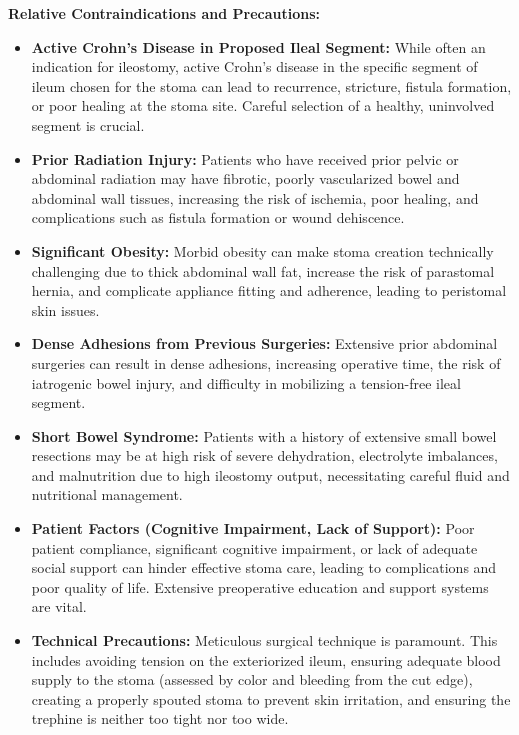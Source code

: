 \textbf{Relative Contraindications and Precautions:}
\begin{itemize}
  \item \textbf{Active Crohn's Disease in Proposed Ileal Segment:} While often an indication for ileostomy, active Crohn's disease in the specific segment of ileum chosen for the stoma can lead to recurrence, stricture, fistula formation, or poor healing at the stoma site. Careful selection of a healthy, uninvolved segment is crucial.
  
  \item \textbf{Prior Radiation Injury:} Patients who have received prior pelvic or abdominal radiation may have fibrotic, poorly vascularized bowel and abdominal wall tissues, increasing the risk of ischemia, poor healing, and complications such as fistula formation or wound dehiscence.
  
  \item \textbf{Significant Obesity:} Morbid obesity can make stoma creation technically challenging due to thick abdominal wall fat, increase the risk of parastomal hernia, and complicate appliance fitting and adherence, leading to peristomal skin issues.
  
  \item \textbf{Dense Adhesions from Previous Surgeries:} Extensive prior abdominal surgeries can result in dense adhesions, increasing operative time, the risk of iatrogenic bowel injury, and difficulty in mobilizing a tension-free ileal segment.
  
  \item \textbf{Short Bowel Syndrome:} Patients with a history of extensive small bowel resections may be at high risk of severe dehydration, electrolyte imbalances, and malnutrition due to high ileostomy output, necessitating careful fluid and nutritional management.
  
  \item \textbf{Patient Factors (Cognitive Impairment, Lack of Support):} Poor patient compliance, significant cognitive impairment, or lack of adequate social support can hinder effective stoma care, leading to complications and poor quality of life. Extensive preoperative education and support systems are vital.
  
  \item \textbf{Technical Precautions:} Meticulous surgical technique is paramount. This includes avoiding tension on the exteriorized ileum, ensuring adequate blood supply to the stoma (assessed by color and bleeding from the cut edge), creating a properly spouted stoma to prevent skin irritation, and ensuring the trephine is neither too tight nor too wide.
\end{itemize}


